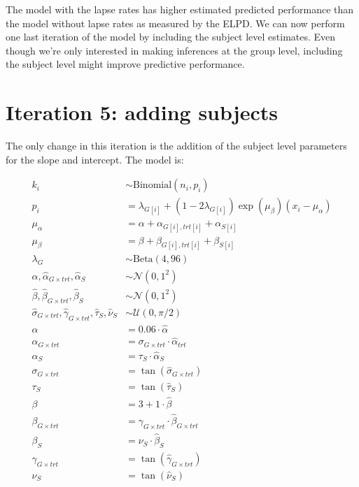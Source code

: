 \documentclass[11pt, oneside, openany]{scrbook}
\begin{document}
The model with the lapse rates has higher estimated predicted performance than the model without lapse rates as measured by the ELPD. We can now perform one last iteration of the model by including the subject level estimates. Even though we're only interested in making inferences at the group level, including the subject level might improve predictive performance.

\hypertarget{iter5}{%
\section{Iteration 5: adding subjects}\label{iter5}}

The only change in this iteration is the addition of the subject level parameters for the slope and intercept. The model is:


\begin{equation}
\begin{split}
k_i &\sim \mathrm{Binomial}(n_i, p_i) \\
p_i &= \lambda_{G[i]} + (1 - 2\lambda_{G[i]})\exp(\mu_\beta) (x_i - \mu_\alpha) \\
\mu_\alpha &= \alpha + \alpha_{G[i], trt[i]} + \alpha_{S[i]} \\
\mu_\beta &= \beta + \beta_{G[i], trt[i]} + \beta_{S[i]} \\
\lambda_{G} &\sim \mathrm{Beta}(4, 96) \\
\hat{\alpha}, \hat{\alpha}_{G\times trt}, \hat{\alpha}_{S} &\sim \mathcal{N}(0, 1^2) \\
\hat{\beta}, \hat{\beta}_{G\times trt}, \hat{\beta}_{S} &\sim \mathcal{N}(0, 1^2) \\
\hat{\sigma}_{G\times trt}, \hat{\gamma}_{G\times trt}, \hat{\tau}_{S}, \hat{\nu}_{S} &\sim \mathcal{U}(0, \pi/2) \\
\alpha &= 0.06 \cdot \hat{\alpha} \\
\alpha_{G\times trt} &= \sigma_{G\times trt} \cdot \hat{\alpha}_{trt} \\
\alpha_{S} &= \tau_{S} \cdot \hat{\alpha}_{S} \\
\sigma_{G \times trt} &= \tan(\hat{\sigma}_{G \times trt}) \\
\tau_{S} &= \tan(\hat{\tau}_{S}) \\
\beta &= 3 + 1 \cdot \hat{\beta} \\
\beta_{G\times trt} &= \gamma_{G\times trt} \cdot \hat{\beta}_{G\times trt} \\
\beta_{S} &= \nu_{S} \cdot \hat{\beta}_{S} \\
\gamma_{G\times trt} &= \tan(\hat{\gamma}_{G\times trt}) \\
\nu_{S} &= \tan(\hat{\nu}_{S})
\end{split}
\label{eq:iter5-model}
\end{equation}
\end{document}
